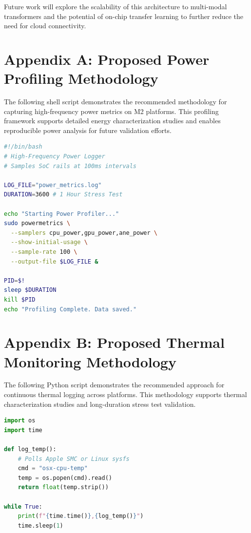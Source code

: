 \documentclass[conference]{IEEEtran}
\begin{document}
Future work will explore the scalability of this architecture to multi-modal transformers \cite{b42, b43} and the potential of on-chip transfer learning to further reduce the need for cloud connectivity.

\section*{Appendix A: Proposed Power Profiling Methodology}
The following shell script demonstrates the recommended methodology for capturing high-frequency power metrics on M2 platforms. This profiling framework supports detailed energy characterization studies and enables reproducible power analysis for future validation efforts.

\begin{lstlisting}[language=bash, caption=M2 Power Profiler (Proposed Validation Tool)]
#!/bin/bash
# High-Frequency Power Logger
# Samples SoC rails at 100ms intervals

LOG_FILE="power_metrics.log"
DURATION=3600 # 1 Hour Stress Test

echo "Starting Power Profiler..."
sudo powermetrics \
  --samplers cpu_power,gpu_power,ane_power \
  --show-initial-usage \
  --sample-rate 100 \
  --output-file $LOG_FILE &

PID=$!
sleep $DURATION
kill $PID
echo "Profiling Complete. Data saved."
\end{lstlisting}

\section*{Appendix B: Proposed Thermal Monitoring Methodology}
The following Python script demonstrates the recommended approach for continuous thermal logging across platforms. This methodology supports thermal characterization studies and long-duration stress test validation.

\begin{lstlisting}[language=python, caption=Thermal Logger (Proposed Validation Tool)]
import os
import time

def log_temp():
    # Polls Apple SMC or Linux sysfs
    cmd = "osx-cpu-temp" 
    temp = os.popen(cmd).read()
    return float(temp.strip())

while True:
    print(f"{time.time()},{log_temp()}")
    time.sleep(1)
\end{lstlisting}
\end{document}
